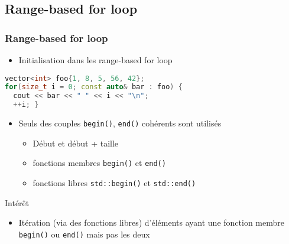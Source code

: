 \documentclass[C++.tex]{subfiles}
\begin{document}
\subsection*{Range-based for loop}
\begin{frame}[fragile]
	\frametitle{Range-based for loop}
	\begin{itemize}
		\item Initialisation dans les range-based for loop
	\end{itemize}

	\begin{lstlisting}[language=C++]
vector<int> foo{1, 8, 5, 56, 42};
for(size_t i = 0; const auto& bar : foo) {
  cout << bar << " " << i << "\n";
  ++i; }\end{lstlisting}

	\begin{itemize}
		\item Seuls des couples \lstinline|begin()|, \lstinline|end()| cohérents sont utilisés
		\begin{itemize}
			\item \og Début\fg{} et \og début + taille\fg{}
			\item fonctions membres \lstinline|begin()| et \lstinline|end()|
			\item fonctions libres \lstinline|std::begin()| et \lstinline|std::end()|
		\end{itemize}
	\end{itemize}

	\begin{block}{Intérêt}
		\begin{itemize}
			\item Itération (via des fonctions libres) d'éléments ayant une fonction membre \lstinline|begin()| ou \lstinline|end()| mais pas les deux
		\end{itemize}
	\end{block}



\end{frame}
\end{document}
